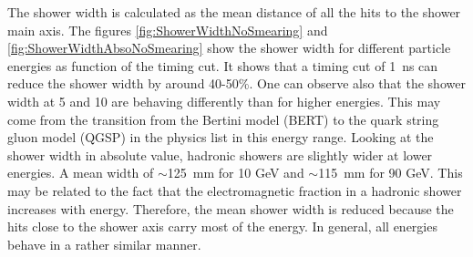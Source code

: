 The shower width is calculated as the mean distance of all the hits to the shower main axis. The figures \ref{fig:ShowerWidthNoSmearing} and \ref{fig:ShowerWidthAbsoNoSmearing} show the shower width for different particle energies as function of the timing cut. It shows that a timing cut of \SI{1}{\nano\second} can reduce the shower width by around 40-50\%. One can observe also that the shower width at 5 and 10 \GeV are behaving differently than for higher energies. This may come from the transition from the Bertini model (BERT) to the quark string gluon model (QGSP) in the physics list in this energy range. Looking at the shower width in absolute value, hadronic showers are slightly wider at lower energies. A mean width of $\sim$\SI{125}{\milli\meter} for 10 GeV and $\sim$\SI{115}{\milli\meter} for 90 GeV. This may be related to the fact that the electromagnetic fraction in a hadronic shower increases with energy. Therefore, the mean shower width is reduced because the hits close to the shower axis carry most of the energy. In general, all energies behave in a rather similar manner.

